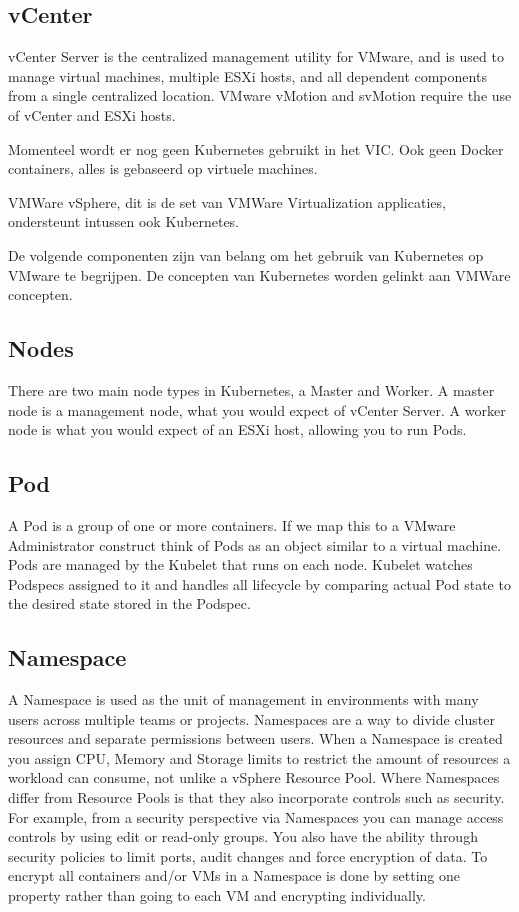 \subsection{vCenter}
vCenter Server is the centralized management utility for VMware, and is used to manage virtual machines, multiple ESXi hosts, and all dependent components from a single centralized location. VMware vMotion and svMotion require the use of vCenter and ESXi hosts.\autocite{Abbas2023}

Momenteel wordt er nog geen Kubernetes gebruikt in het VIC. Ook geen Docker containers, alles is gebaseerd op virtuele machines.

VMWare vSphere, dit is de set van VMWare Virtualization applicaties, ondersteunt intussen ook Kubernetes.

De volgende componenten zijn van belang om het gebruik van Kubernetes op VMware te begrijpen. De concepten van Kubernetes worden gelinkt aan VMWare concepten.

\subsection{Nodes}
There are two main node types in Kubernetes, a Master and Worker. A master node is a management node, what you would expect of vCenter Server. A worker node is what you would expect of an ESXi host, allowing you to run Pods.\autocite{xxx}

\subsection{Pod}
A Pod is a group of one or more containers. If we map this to a VMware Administrator construct think of Pods as an object similar to a virtual machine. Pods are managed by the Kubelet that runs on each node. Kubelet watches Podspecs assigned to it and handles all lifecycle by comparing actual Pod state to the desired state stored in the Podspec.\autocite{xxx}

\subsection{Namespace}
A Namespace is used as the unit of management in environments with many users across multiple teams or projects. Namespaces are a way to divide cluster resources and separate permissions between users. When a Namespace is created you assign CPU, Memory and Storage limits to restrict the amount of resources a workload can consume, not unlike a vSphere Resource Pool. Where Namespaces differ from Resource Pools is that they also incorporate controls such as security. For example, from a security perspective via Namespaces you can manage access controls by using edit or read-only groups. You also have the ability through security policies to limit ports, audit changes and force encryption of data. To encrypt all containers and/or VMs in a Namespace is done by setting one property rather than going to each VM and encrypting individually.\autocite{xxx}

